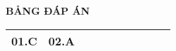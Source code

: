 \loigiai
{
	\begin{center}
		\textbf{BẢNG ĐÁP ÁN}
	\end{center}
	\begin{center}
		\begin{tabular}{|m{2.8em}|m{2.8em}|m{2.8em}|m{2.8em}|m{2.8em}|m{2.8em}|m{2.8em}|m{2.8em}|m{2.8em}|m{2.8em}|}
			\hline
			01.C  & 02.A  &  &  &  &  & &  & &  \\
			\hline
			
		\end{tabular}
	\end{center}
}


\whiteBGstarEnd